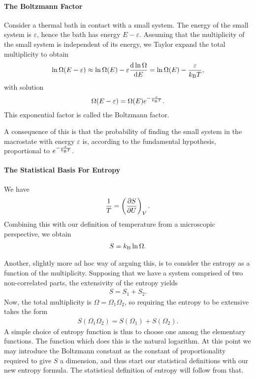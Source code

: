 \paragraph{The Boltzmann Factor}
Consider a thermal bath in contact with a small system. The energy of the small system is $\varepsilon$, hence the bath has energy $E - \varepsilon$. Assuming that the multiplicity of the small system is independent of its energy, we Taylor expand the total multiplicity to obtain
\begin{align*}
	\ln{\Omega(E - \varepsilon)} \approx \ln{\Omega(E)} - \varepsilon\dv{\ln{\Omega}}{E} = \ln{\Omega(E)} - \frac{\varepsilon}{k_{\text{B}} T},
\end{align*}
with solution
\begin{align*}
	\Omega(E - \varepsilon) = \Omega(E)e^{-\frac{\varepsilon}{k_{\text{B}} T}}.
\end{align*}
This exponential factor is called the Boltzmann factor.

A consequence of this is that the probability of finding the small system in the macrostate with energy $\varepsilon$ is, according to the fundamental hypothesis, proportional to $e^{-\frac{\varepsilon}{k_{\text{B}} T}}$.

\paragraph{The Statistical Basis For Entropy}
We have
\begin{align*}
	\frac{1}{T} = \left(\pdv{S}{U}\right)_{V}.
\end{align*}
Combining this with our definition of temperature from a microscopic perspective, we obtain
\begin{align*}
	S = k_{\text{B}}\ln{\Omega}.
\end{align*}

Another, slightly more ad hoc way of arguing this, is to consider the entropy as a function of the multiplicity. Supposing that we have a system comprised of two non-correlated parts, the extensivity of the entropy yields
\begin{align*}
	S = S_{1} + S_{2}.
\end{align*}
Now, the total multiplicity is $\Omega = \Omega_{1}\Omega_{2}$, so requiring the entropy to be extensive takes the form
\begin{align*}
	S(\Omega_{1}\Omega_{2}) = S(\Omega_{1}) + S(\Omega_{2}).
\end{align*}
A simple choice of entropy function is thus to choose one among the elementary functions. The function which does this is the natural logarithm. At this point we may introduce the Boltzmann constant as the constant of proportionality required to give $S$ a dimension, and thus start our statistical definitions with our new entropy formula. The statistical definition of entropy will follow from that.

